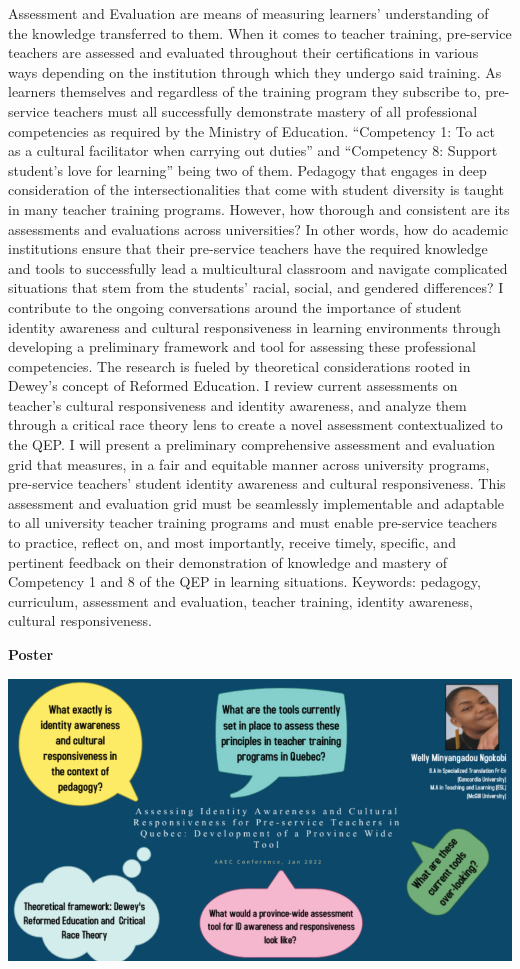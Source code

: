 \documentclass[
]{book}
\begin{document}
Assessment and Evaluation are means of measuring learners' understanding of the knowledge transferred to them. When it comes to teacher training, pre-service teachers are assessed and evaluated throughout their certifications in various ways depending on the institution through which they undergo said training. As learners themselves and regardless of the training program they subscribe to, pre-service teachers must all successfully demonstrate mastery of all professional competencies as required by the Ministry of Education. ``Competency 1: To act as a cultural facilitator when carrying out duties'' and ``Competency 8: Support student's love for learning'' being two of them. Pedagogy that engages in deep consideration of the intersectionalities that come with student diversity is taught in many teacher training programs. However, how thorough and consistent are its assessments and evaluations across universities? In other words, how do academic institutions ensure that their pre-service teachers have the required knowledge and tools to successfully lead a multicultural classroom and navigate complicated situations that stem from the students' racial, social, and gendered differences? I contribute to the ongoing conversations around the importance of student identity awareness and cultural responsiveness in learning environments through developing a preliminary framework and tool for assessing these professional competencies. The research is fueled by theoretical considerations rooted in Dewey's concept of Reformed Education. I review current assessments on teacher's cultural responsiveness and identity awareness, and analyze them through a critical race theory lens to create a novel assessment contextualized to the QEP. I will present a preliminary comprehensive assessment and evaluation grid that measures, in a fair and equitable manner across university programs, pre-service teachers' student identity awareness and cultural responsiveness. This assessment and evaluation grid must be seamlessly implementable and adaptable to all university teacher training programs and must enable pre-service teachers to practice, reflect on, and most importantly, receive timely, specific, and pertinent feedback on their demonstration of knowledge and mastery of Competency 1 and 8 of the QEP in learning situations. Keywords: pedagogy, curriculum, assessment and evaluation, teacher training, identity awareness, cultural responsiveness.

\textbf{Poster}

\includegraphics{Content/WM.png}
\end{document}
